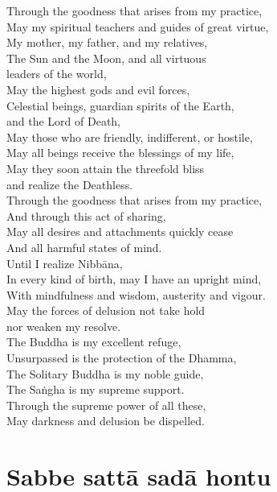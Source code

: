 Through the goodness that arises from my practice,\\
May my spiritual teachers and guides of great virtue,\\
My mother, my father, and my relatives,\\
The Sun and the Moon, and all virtuous\\\vin leaders of the world,\\
May the highest gods and evil forces,\\
Celestial beings, guardian spirits of the Earth,\\\vin and the Lord of Death,\\
May those who are friendly, indifferent, or hostile,\\
May all beings receive the blessings of my life,\\
May they soon attain the threefold bliss\\\vin and realize the Deathless.\\
Through the goodness that arises from my practice,\\
And through this act of sharing,\\
May all desires and attachments quickly cease\\
And all harmful states of mind.\\
Until I realize Nibbāna,\\
In every kind of birth, may I have an upright mind,\\
With mindfulness and wisdom, austerity and vigour.\\
May the forces of delusion not take hold\\\vin nor weaken my resolve.\\
The Buddha is my excellent refuge,\\
Unsurpassed is the protection of the Dhamma,\\
The Solitary Buddha is my noble guide,\\
The Saṅgha is my supreme support.\\
Through the supreme power of all these,\\
May darkness and delusion be dispelled.\\

\section{Sabbe sattā sadā hontu}

